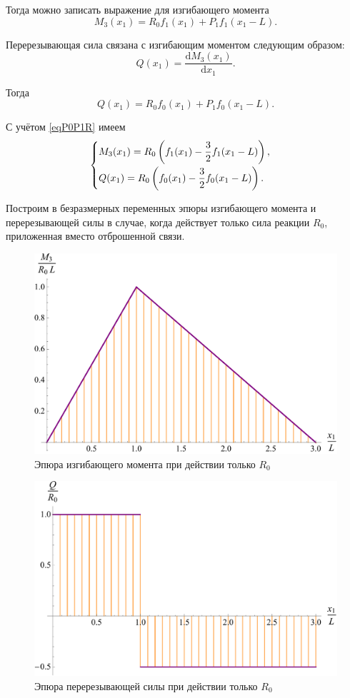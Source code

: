 \documentclass[12pt, a4paper]{article}
\begin{document}
Тогда можно записать выражение для изгибающего момента
\[
M_3(x_1) = R_0 f_1(x_1) + P_1 f_1(x_1 - L).
\]

Перерезывающая сила связана с изгибающим моментом следующим образом:
\begin{equation}
	Q(x_1) = \dfrac{\mathrm{d} M_3(x_1)}{\mathrm{d} x_1}.
	\label{eqQ}
\end{equation}

Тогда
\[
Q(x_1) = R_0 f_0(x_1) + P_1 f_0(x_1 - L).
\]

С учётом \eqref{eqP0P1R} имеем
\begin{equation}
	\begin{cases} \vspace{0.25em}
		M_3(x_1) = R_0 \left( f_1(x_1) - \dfrac{3}{2} f_1(x_1 - L) \right), \\
		Q(x_1) = R_0 \left( f_0(x_1) - \dfrac{3}{2} f_0(x_1 - L) \right). \\
	\end{cases}
	\label{eqM3QR}
\end{equation}

Построим в безразмерных переменных эпюры изгибающего момента и перерезывающей силы в случае, когда действует только сила реакции $R_0$, приложенная вместо отброшенной связи.

\begin{figure}[!h]
	\centering
	\includegraphics[width=0.75\linewidth]{plot-5}
	\caption{Эпюра изгибающего момента при действии только $R_0$}
\end{figure} 

\newpage

\begin{figure}[!h]
	\centering
	\includegraphics[width=0.75\linewidth]{plot-6}
	\caption{Эпюра перерезывающей силы при действии только $R_0$}
\end{figure}
\end{document}
